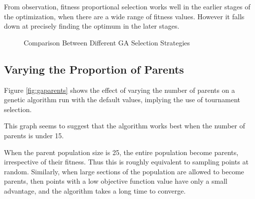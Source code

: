 \documentclass[a4paper,12pt]{article}
\begin{document}
From observation, fitness proportional selection works well in the earlier stages of the optimization, when there are a wide range of fitness values.
However it falls down at precisely finding the optimum in the later stages.

\begin{figure}[H]
\centering
{}
\caption{Comparison Between Different GA Selection Strategies}
\label{fig:gastrat}
\end{figure}

\subsection{ Varying the Proportion of Parents }

Figure \ref{fig:gaparents} shows the effect of varying the number of parents on a genetic algorithm run with the default values, implying the use of tournament selection.

This graph seems to suggest that the algorithm works best when the number of parents is under 15.

When the parent population size is 25, the entire population become parents, irrespective of their fitness. 
Thus this is roughly equivalent to sampling points at random. 
Similarly, when large sections of the population are allowed to become parents, then points with a low objective function value have only a small advantage, and the algorithm takes a long time to converge.   
\end{document}
